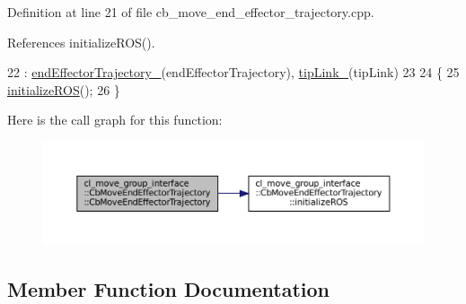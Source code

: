 Definition at line 21 of file cb\+\_\+move\+\_\+end\+\_\+effector\+\_\+trajectory.\+cpp.



References initialize\+R\+O\+S().


\begin{DoxyCode}
22         : \hyperlink{classcl__move__group__interface_1_1CbMoveEndEffectorTrajectory_ae13dfd31ea3660646e03882f0c2c29f0}{endEffectorTrajectory\_}(endEffectorTrajectory), 
      \hyperlink{classcl__move__group__interface_1_1CbMoveEndEffectorTrajectory_a24c6c30b9b0761a61fa002d947bd3e11}{tipLink\_}(tipLink)
23 
24     \{
25         \hyperlink{classcl__move__group__interface_1_1CbMoveEndEffectorTrajectory_afcee8f3853a5cef8806137a304c8a14b}{initializeROS}();
26     \}
\end{DoxyCode}
Here is the call graph for this function\+:
\nopagebreak
\begin{figure}[H]
\begin{center}
\leavevmode
\includegraphics[width=350pt]{classcl__move__group__interface_1_1CbMoveEndEffectorTrajectory_ae6985de3f8f0e1ec7dea88c1e551889a_cgraph}
\end{center}
\end{figure}


\subsection{Member Function Documentation}
\mbox{\label{classcl__move__group__interface_1_1CbMoveEndEffectorTrajectory_a485057c052729edd3e8303440b7ada66}} 
